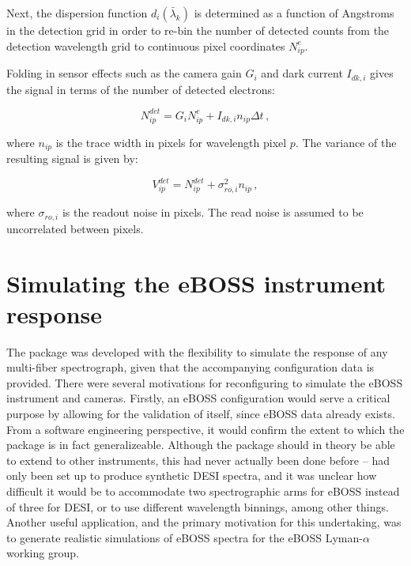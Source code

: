 
Next, the dispersion function $d_i(\bar{\lambda}_{k})$ is determined as a function of Angstroms in the detection grid in order to re-bin the number of detected counts from the detection wavelength grid to continuous pixel coordinates $N_{ip}^{e}$.

Folding in sensor effects such as the camera gain $G_{i}$ and dark current $I_{dk,i}$ gives the signal in terms of the number of detected electrons:

\begin{equation}
    N_{ip}^{det} = G_{i}N_{ip}^{e} + I_{dk,i}n_{ip}\Delta t\,,
\end{equation}

where $n_{ip}$ is the trace width in pixels for wavelength pixel $p$. The variance of the resulting signal is given by:

\begin{equation}
    V_{ip}^{det} = N_{ip}^{det} + \sigma_{ro,i}^{2}n_{ip}\,,
\end{equation}

where $\sigma_{ro,i}$ is the readout noise in pixels. The read noise is assumed to be uncorrelated between pixels.


\section{Simulating the eBOSS instrument response}


The  package was developed with the flexibility to simulate the response of any multi-fiber spectrograph, given that the accompanying configuration data is provided. There were several motivations for reconfiguring  to simulate the eBOSS instrument and cameras. Firstly, an eBOSS configuration would serve a critical purpose by allowing for the validation of  itself, since eBOSS data already exists. From a software engineering perspective, it would confirm the extent to which the package is in fact generalizeable. Although the package should in theory be able to extend to other instruments, this had never actually been done before --  had only been set up to produce synthetic DESI spectra, and it was unclear how difficult it would be to accommodate two spectrographic arms for eBOSS instead of three for DESI, or to use different wavelength binnings, among other things. Another useful application, and the primary motivation for this undertaking, was to generate realistic simulations of eBOSS spectra for the eBOSS Lyman-$\alpha$ working group.

